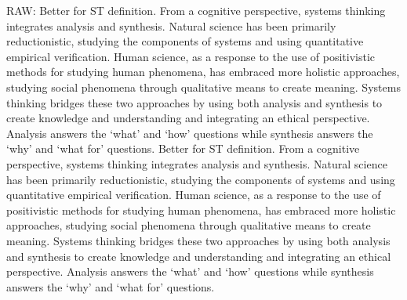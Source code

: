 RAW:
Better for ST definition. From a cognitive perspective, systems thinking integrates analysis and synthesis. Natural science has been primarily reductionistic, studying the components of systems and using quantitative empirical verification. Human science, as a response to the use of positivistic methods for studying human phenomena, has embraced more holistic approaches, studying social phenomena through qualitative means to create meaning. Systems thinking bridges these two approaches by using both analysis and synthesis to create knowledge and understanding and integrating an ethical perspective. Analysis answers the ‘what’ and ‘how’ questions while synthesis answers the ‘why’ and ‘what for’ questions. Better for ST definition. From a cognitive perspective, systems thinking integrates analysis and synthesis. Natural science has been primarily reductionistic, studying the components of systems and using quantitative empirical verification. Human science, as a response to the use of positivistic methods for studying human phenomena, has embraced more holistic approaches, studying social phenomena through qualitative means to create meaning. Systems thinking bridges these two approaches by using both analysis and synthesis to create knowledge and understanding and integrating an ethical perspective. Analysis answers the ‘what’ and ‘how’ questions while synthesis answers the ‘why’ and ‘what for’ questions.